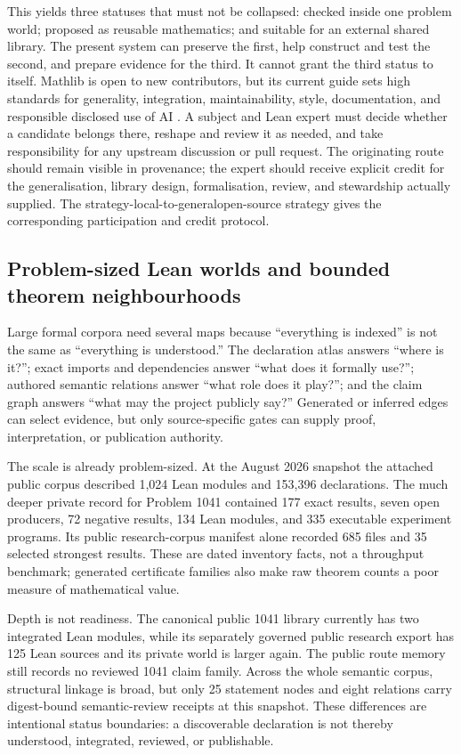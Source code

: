 \documentclass[10pt]{article}
\begin{document}
This yields three statuses that must not be collapsed: checked inside one
problem world; proposed as reusable mathematics; and suitable for an external
shared library. The present system can preserve the first, help construct and
test the second, and prepare evidence for the third. It cannot grant the third
status to itself. Mathlib is open to new contributors, but its current guide
sets high standards for generality, integration, maintainability, style,
documentation, and responsible disclosed use of AI \cite{mathlib}. A subject
and Lean expert must decide whether a candidate belongs there, reshape and
review it as needed, and take responsibility for any upstream discussion or
pull request. The originating route should remain visible in provenance; the
expert should receive explicit credit for the generalisation, library design,
formalisation, review, and stewardship actually supplied. The
%
{strategy-local-to-general}{open-source strategy} gives the corresponding
participation and credit protocol.

\subsection{Problem-sized Lean worlds and bounded theorem neighbourhoods}

Large formal corpora need several maps because ``everything is indexed'' is
not the same as ``everything is understood.'' The declaration atlas answers
``where is it?''; exact imports and dependencies answer ``what does it formally
use?''; authored semantic relations answer ``what role does it play?''; and the
claim graph answers ``what may the project publicly say?'' Generated or inferred
edges can select evidence, but only source-specific gates can supply proof,
interpretation, or publication authority.

The scale is already problem-sized. At the August 2026 snapshot the attached
public corpus described 1,024 Lean modules and 153,396 declarations. The much
deeper private record for Problem 1041 contained 177 exact results, seven open
producers, 72 negative results, 134 Lean modules, and 335 executable experiment
programs. Its public research-corpus manifest alone recorded 685 files and 35
selected strongest results. These are dated inventory facts, not a throughput
benchmark; generated certificate families also make raw theorem counts a poor
measure of mathematical value.

Depth is not readiness. The canonical public 1041 library currently has two
integrated Lean modules, while its separately governed public research export
has 125 Lean sources and its private world is larger again. The public route
memory still records no reviewed 1041 claim family. Across the whole semantic
corpus, structural linkage is broad, but only 25 statement nodes and eight
relations carry digest-bound semantic-review receipts at this snapshot. These
differences are intentional status boundaries: a discoverable declaration is
not thereby understood, integrated, reviewed, or publishable.
\end{document}
